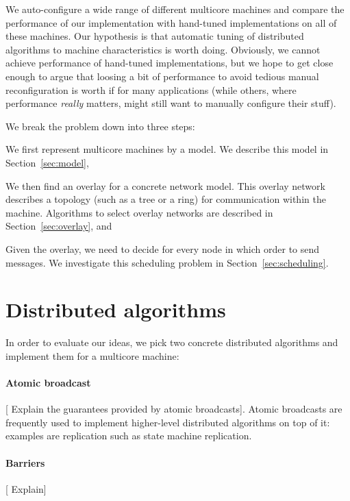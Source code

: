 \documentclass{article}
\newcommand{\stefan}[1]{
  {\color{skRed}[{\color{red}{SK}} #1]}}
\begin{document}
We auto-configure a wide range of different multicore machines and
compare the performance of our implementation with hand-tuned
implementations on all of these machines.
Our hypothesis is that automatic tuning of distributed algorithms 
to machine characteristics is worth
doing. Obviously, we cannot achieve performance of hand-tuned
implementations, but we hope to get close enough to argue that loosing
a bit of performance to avoid tedious manual reconfiguration is worth
if for many applications (while others, where performance
\emph{really} matters, might still want to manually configure their
stuff).

We break the problem down into three steps:
\begin{inparaenum}[\itshape 1\upshape)]
\item We first represent multicore machines by a model. We describe
  this model in Section~\ref{sec:model},
\item We then find an overlay for a concrete network model. This
  overlay network describes a topology (such as a tree or a ring) for
  communication within the machine. Algorithms to select overlay
  networks are described in Section~\ref{sec:overlay}, and
\item Given the overlay, we need to decide for every node in which
  order to send messages. We investigate this scheduling problem in
  Section~\ref{sec:scheduling}.
\end{inparaenum}

\section{Distributed algorithms}
\label{sec:distalgo}

In order to evaluate our ideas, we pick two concrete distributed
algorithms and implement them for a multicore machine:

\paragraph{Atomic broadcast} \stefan{Explain the guarantees provided
  by atomic broadcasts}. Atomic broadcasts are frequently used to
implement higher-level distributed algorithms on top of it: examples
are replication such as state machine replication. 

\paragraph{Barriers} \stefan{Explain}
\end{document}
